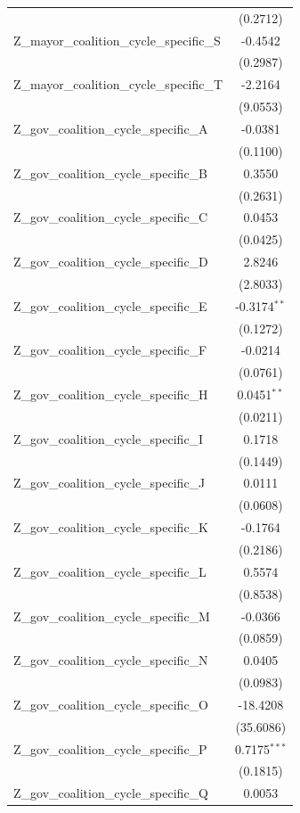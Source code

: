 \begin{tabular}{lc}
 & (0.2712) \\
Z\_mayor\_coalition\_cycle\_specific\_S & -0.4542 \\
 & (0.2987) \\
Z\_mayor\_coalition\_cycle\_specific\_T & -2.2164 \\
 & (9.0553) \\
Z\_gov\_coalition\_cycle\_specific\_A & -0.0381 \\
 & (0.1100) \\
Z\_gov\_coalition\_cycle\_specific\_B & 0.3550 \\
 & (0.2631) \\
Z\_gov\_coalition\_cycle\_specific\_C & 0.0453 \\
 & (0.0425) \\
Z\_gov\_coalition\_cycle\_specific\_D & 2.8246 \\
 & (2.8033) \\
Z\_gov\_coalition\_cycle\_specific\_E & -0.3174$^{**}$ \\
 & (0.1272) \\
Z\_gov\_coalition\_cycle\_specific\_F & -0.0214 \\
 & (0.0761) \\
Z\_gov\_coalition\_cycle\_specific\_H & 0.0451$^{**}$ \\
 & (0.0211) \\
Z\_gov\_coalition\_cycle\_specific\_I & 0.1718 \\
 & (0.1449) \\
Z\_gov\_coalition\_cycle\_specific\_J & 0.0111 \\
 & (0.0608) \\
Z\_gov\_coalition\_cycle\_specific\_K & -0.1764 \\
 & (0.2186) \\
Z\_gov\_coalition\_cycle\_specific\_L & 0.5574 \\
 & (0.8538) \\
Z\_gov\_coalition\_cycle\_specific\_M & -0.0366 \\
 & (0.0859) \\
Z\_gov\_coalition\_cycle\_specific\_N & 0.0405 \\
 & (0.0983) \\
Z\_gov\_coalition\_cycle\_specific\_O & -18.4208 \\
 & (35.6086) \\
Z\_gov\_coalition\_cycle\_specific\_P & 0.7175$^{***}$ \\
 & (0.1815) \\
Z\_gov\_coalition\_cycle\_specific\_Q & 0.0053 \\

\end{tabular}
